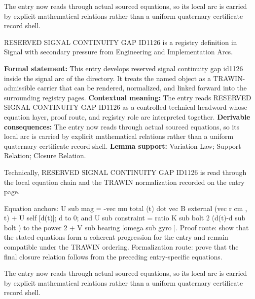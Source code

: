The entry now reads through actual sourced equations, so its local arc is carried by explicit mathematical relations rather than a uniform quaternary certificate record shell.
\clearpage


\begingroup\small
{}
RESERVED SIGNAL CONTINUITY GAP ID1126 is a registry definition in Signal with secondary pressure from Engineering and Implementation Arcs.

\begingroup\footnotesize\setlength{\emergencystretch}{3em}\sloppy
\textbf{Formal statement:} This entry develops reserved signal continuity gap id1126 inside the signal arc of the directory. It treats the named object as a TRAWIN-admissible carrier that can be rendered, normalized, and linked forward into the surrounding registry pages. \textbf{Contextual meaning:} The entry reads RESERVED SIGNAL CONTINUITY GAP ID1126 as a controlled technical headword whose equation layer, proof route, and registry role are interpreted together. \textbf{Derivable consequences:} The entry now reads through actual sourced equations, so its local arc is carried by explicit mathematical relations rather than a uniform quaternary certificate record shell. \textbf{Lemma support:} Variation Law; Support Relation; Closure Relation.\par
\endgroup

Technically, RESERVED SIGNAL CONTINUITY GAP ID1126 is read through the local equation chain and the TRAWIN normalization recorded on the entry page.

Equation anchors: U sub mag = -vec mu total (t) dot vec B external (vec r cm , t) + U self [d(t)]; d to 0; and U sub constraint = ratio K sub bolt 2 (d(t)-d sub bolt ) to the power 2 + V sub bearing [omega sub gyro ]. Proof route: show that the stated equations form a coherent progression for the entry and remain compatible under the TRAWIN ordering. Formalization route: prove that the final closure relation follows from the preceding entry-specific equations.

The entry now reads through actual sourced equations, so its local arc is carried by explicit mathematical relations rather than a uniform quaternary certificate record shell.
\endgroup

